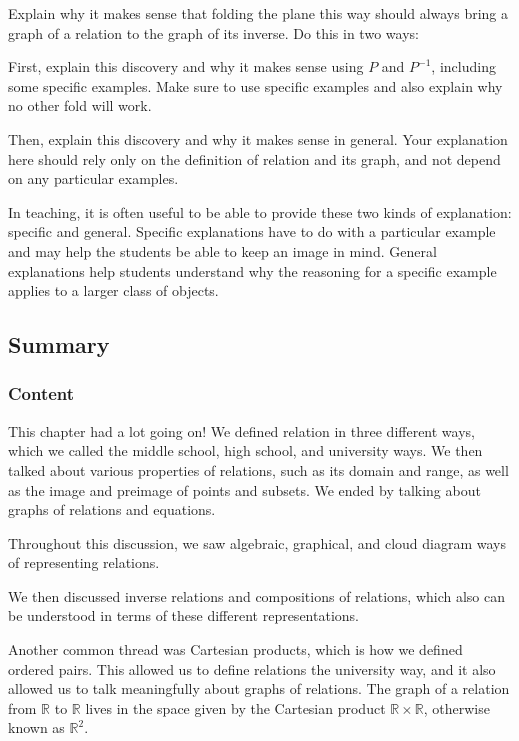 \documentclass[11pt]{article}
\newenvironment{task}
	{\begin{mdframed}[linecolor=lightgray, linewidth=3pt]\raggedright}
	{\end{mdframed}}
\newcommand{\R}{\mathbb{R}}
\theoremstyle{definition}
\begin{document}
\begin{task}
Explain why it makes sense that folding the plane this way should always bring a graph of a relation to the graph of its inverse. Do this in two ways:
	\begin{itemize*}
	\item First, explain this discovery and why it makes sense using $P$ and $P^{-1}$, including some specific examples. Make sure to use specific examples and also explain why no other fold will work.
	\item Then, explain this discovery and why it makes sense in general. Your explanation here should rely only on the definition of relation and its graph, and not depend on any particular examples. 
	\end{itemize*}
\end{task}

In teaching, it is often useful to be able to provide these two kinds of explanation: specific and general. Specific explanations have to do with a particular example and may help the students be able to keep an image in mind. General explanations help students understand why the reasoning for a specific example applies to a larger class of objects.

\newpage
\subsection{Summary}

\subsubsection*{Content}
This chapter had a lot going on! We defined relation in three different ways, which we called the middle school, high school, and university ways. We then talked about various properties of relations, such as its domain and range, as well as the image and preimage of points and subsets. We ended by talking about graphs of relations and equations.

Throughout this discussion, we saw algebraic, graphical, and cloud diagram ways of representing relations. 

We then discussed inverse relations and compositions of relations, which also can be understood in terms of these different representations. 
 
 Another common thread was Cartesian products, which is how we defined ordered pairs.  This allowed us to define relations the university way, and it also allowed us to talk meaningfully about graphs of relations.  The graph of a relation from $\R$ to $\R$ lives in the space given by the Cartesian product $\R\times \R$, otherwise known as $\R^2$. 
 
\end{document}
